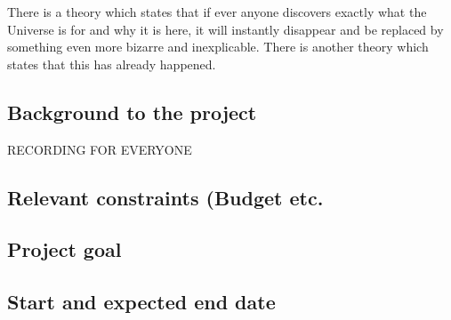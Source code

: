 There is a theory which states that if ever anyone discovers exactly what the Universe is for and why it is here, it will instantly disappear and be replaced by something even more bizarre and inexplicable.
There is another theory which states that this has already happened.

\subsection{Background to the project}
RECORDING FOR EVERYONE
\subsection{Relevant constraints (Budget etc.}

\subsection{Project goal}

\subsection{Start and expected end date}